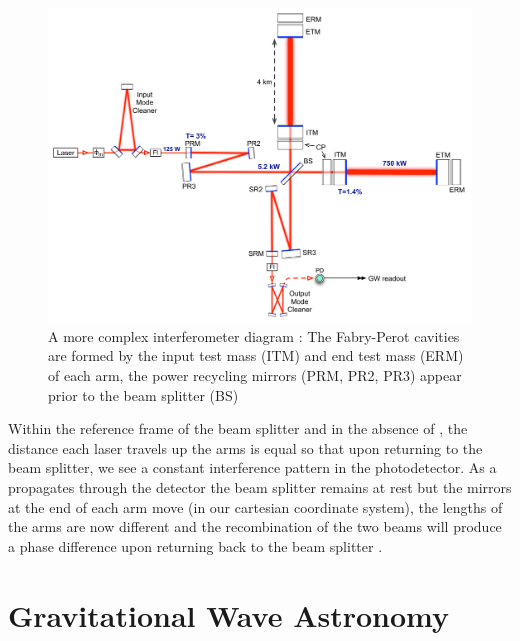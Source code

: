 \begin{figure}
   \includegraphics[width=\textwidth]{images/1_general_relativity/IFOdiagram.pdf}
   \caption{\label{fig:IFO}A more complex interferometer diagram \cite{aLIGO:2015}: The Fabry-Perot cavities are formed by the input test mass (ITM) and end test mass (ERM) of each arm, the power recycling mirrors (PRM, PR2, PR3) appear prior to the beam splitter (BS)}
\end{figure}

Within the reference frame of the beam splitter and in the absence of \gws, the distance each laser travels up the arms is equal so that upon returning to the beam splitter, we see a constant interference pattern in the photodetector.
As a \gw propagates through the detector the beam splitter remains at rest but the mirrors at the end of each arm move (in our cartesian coordinate system), the lengths of the arms are now different and the recombination of the two beams will produce a phase difference upon returning back to the beam splitter \cite{thorne_lecture}.

\section{\label{1:sec:GW-astronomy}Gravitational Wave Astronomy}

